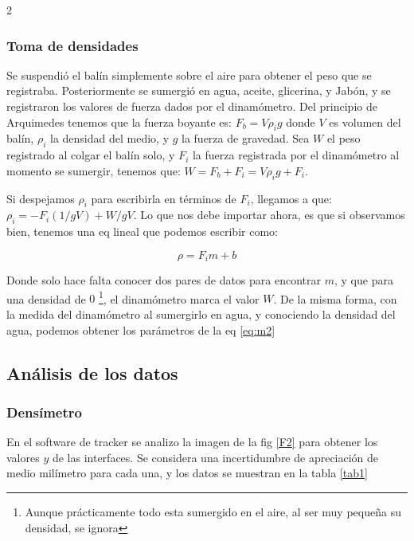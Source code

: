 \documentclass[10pt,letterpaper]{article}
\begin{document}
\begin{multicols}{2}
   \subsubsection{Toma de densidades}

    Se suspendió el balín simplemente sobre el aire para obtener el peso que se registraba. Posteriormente se sumergió en agua, aceite, glicerina, y Jabón, y se registraron los valores de fuerza dados por el dinamómetro.  
    Del principio de Arquimedes tenemos que la fuerza boyante es: $F_b = V \rho_i g$ donde $V$ es volumen del balín, $\rho_i$ la densidad del medio, y $g$ la fuerza de gravedad. Sea $W$ el peso registrado al colgar el balín solo, y $F_i$ la fuerza registrada por el dinamómetro al momento se sumergir, tenemos que: $W = F_b + F_i = V \rho_i g + F_i$.
    
    Si despejamos $\rho_i$ para escribirla en términos de $F_i$, llegamos a que: $\rho_i = - F_i (1/gV) + W/gV$. Lo que nos debe importar ahora, es que si observamos bien, tenemos una eq lineal que podemos escribir como:

    \begin{equation}
        \label{eq:m2}
        \rho = F_i m + b
    \end{equation}

    Donde solo hace falta conocer dos pares de datos para encontrar $m$, y que para una densidad de $0$ \footnote{Aunque prácticamente todo esta sumergido en el aire, al ser muy pequeña su densidad, se ignora}, el dinamómetro marca el valor $W$. De la misma forma, con la medida del dinamómetro al sumergirlo en agua, y conociendo la densidad del agua, podemos obtener los parámetros de la eq \ref{eq:m2}

    

    

    \subsection{Análisis de los datos}

    \subsubsection{Densímetro}

    En el software de tracker se analizo la imagen de la fig \ref{F2} para obtener los valores $y$ de las interfaces. Se considera una incertidumbre de apreciación de medio milímetro para cada una, y los datos se muestran en la tabla \ref{tab1}


\end{multicols}
\end{document}
